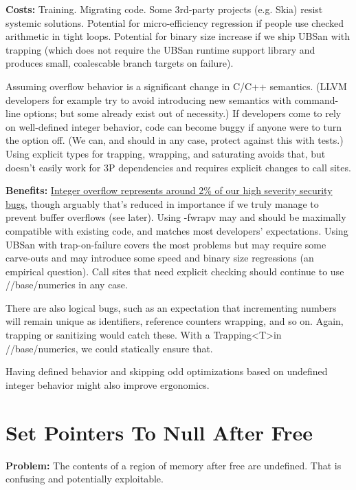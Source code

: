 \documentclass[a4paper,12pt,notitlepage,twoside,openright]{article}
\newcommand{\uline}[1]{#1}
\begin{document}
{\textbf{Costs:} Training. Migrating code. Some 3rd-party projects (e.g.
Skia) resist systemic solutions. Potential for micro-efficiency
regression if people use checked arithmetic in tight loops. Potential
for binary size increase if we ship UBSan with trapping (which does not
require the UBSan runtime support library and produces small,
coalescable branch targets on failure).

Assuming overflow behavior is a significant change in C/C++ semantics.
(LLVM developers for example try to avoid introducing new semantics with
command-line options; but some already exist out of necessity.) If
developers come to rely on well-defined integer behavior, code can
become buggy if anyone were to turn the option off. (We can, and should
in any case, protect against this with tests.) Using explicit types for
trapping, wrapping, and saturating avoids that, but doesn't easily work
for 3P dependencies and requires explicit changes to call sites.

\textbf{Benefits:} \href{https://docs.google.com/document/d/e/2PACX-1vRZr-HJcYmf2Y76DhewaiJOhRNpjGHCxliAQTBhFxzv1QTae9o8mhBmDl32CRIuaWZLt5kVeH9e9jXv/pub\#h.eoikp3r0cwlf}{\uline{Integer
overflow represents around 2\% of our high severity security bugs}},
though arguably that's reduced in importance if we truly manage to
prevent buffer overflows (see later). Using -fwrapv may and should
be maximally compatible with existing code, and matches most developers'
expectations. Using UBSan with trap-on-failure covers the most problems
but may require some carve-outs and may introduce some speed and binary
size regressions (an empirical question). Call sites that need explicit
checking should continue to use //base/numerics in any case.

There are also logical bugs, such as an expectation that incrementing
numbers will remain unique as identifiers, reference counters wrapping,
and so on. Again, trapping or sanitizing would catch these. With
a Trapping\textless T\textgreater in //base/numerics, we could
statically ensure that.

Having defined behavior and skipping odd optimizations based on
undefined integer behavior might also improve ergonomics.

\section{Set Pointers To Null After Free}

\textbf{Problem:} The contents of a region of memory after free are
undefined. That is confusing and potentially exploitable.

}
\end{document}
